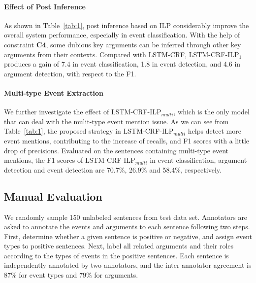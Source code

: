 \paragraph{Effect of Post Inference} 
As shown in Table~\ref{tab:1}, post inference based on ILP considerably improve the overall system performance, especially in event classification. With the help of constraint \textbf{C4},  some dubious key arguments can be inferred through other key arguments from their contexts. Compared with LSTM-CRF, LSTM-CRF-ILP$_1$ produces a gain of 7.4 in event classification, 1.8 in event detection, and 4.6 in argument detection, with respect to the F1. 

\paragraph{Multi-type Event Extraction}
We further investigate the effect of LSTM-CRF-ILP$_{multi}$, which is the only model that can deal with the mulit-type event mention issue. As we can see from Table~\ref{tab:1}, the proposed strategy in LSTM-CRF-ILP$_{multi}$ helps detect more event mentions, contributing to the increase of recalls, and F1 scores with a little drop of precisions. Evaluated on the sentences containing multi-type event mentions, the F1 scores of LSTM-CRF-ILP$_{multi}$ in event classification, argument detection and event detection are 70.7\%, 26.9\% and 58.4\%, respectively. 

\subsection{Manual Evaluation \label{manualeve}}
We randomly sample 150 unlabeled sentences from test data set. Annotators are asked to annotate the events and arguments to each sentence following two steps. First, determine whether a given sentence is positive or negative, and assign event types to positive sentences. Next, label all related arguments and their roles according to the types of events in the positive sentences. Each sentence is independently annotated by two annotators, and the inter-annotator agreement is 87\% for event types and 79\% for arguments.

